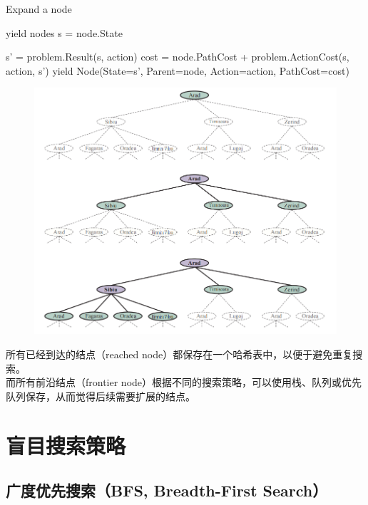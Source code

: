 \begin{algorithm}[H]
    \caption{Expand a node}
    \begin{algorithmic}[1]
         yield nodes
        \State s = node.State

        \State s' = problem.Result(s, action)
        \State cost = node.PathCost + problem.ActionCost(s, action, s')
        \State yield Node(State=s', Parent=node, Action=action, PathCost=cost)
        \EndFor
        \EndProcedure
    \end{algorithmic}
\end{algorithm}

\begin{figure}[H]
    \centering
    \includegraphics[scale=0.8]{img/C1/1-3/4.png}
\end{figure}

所有已经到达的结点（reached node）都保存在一个哈希表中，以便于避免重复搜索。\\

而所有前沿结点（frontier node）根据不同的搜索策略，可以使用栈、队列或优先队列保存，从而觉得后续需要扩展的结点。

\newpage

\section{盲目搜索策略}

\subsection{广度优先搜索（BFS, Breadth-First Search）}

